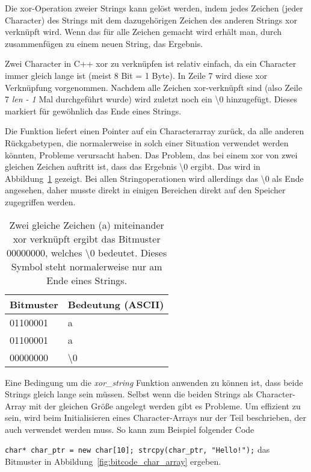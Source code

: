 \documentclass[]{article}
\begin{document}
Die xor-Operation zweier Strings kann gelöst werden, indem jedes Zeichen (jeder Character) des Strings mit dem dazugehörigen Zeichen des anderen Strings xor verknüpft wird. Wenn das für alle Zeichen gemacht wird erhält man, durch zusammenfügen zu einem neuen String, das Ergebnis.

Zwei Character in C++ xor zu verknüpfen ist relativ einfach, da ein Character immer gleich lange ist (meist 8 Bit = 1 Byte). In Zeile 7 wird diese xor Verknüpfung vorgenommen. Nachdem alle Zeichen xor-verknüpft sind (also Zeile 7 \textit{len - 1} Mal durchgeführt wurde) wird zuletzt noch ein \textbackslash 0 hinzugefügt. Dieses markiert für gewöhnlich das Ende eines Strings.

Die Funktion liefert einen Pointer auf ein Characterarray zurück, da alle anderen Rückgabetypen, die normalerweise in solch einer Situation verwendet werden könnten, Probleme verursacht haben. Das Problem, das bei einem xor von zwei gleichen Zeichen auftritt ist, dass das Ergebnis \textbackslash 0 ergibt. Das wird in Abbildung~\ref{fig:xor_gleiches_zeichen} gezeigt. Bei allen Stringoperationen wird allerdings das \textbackslash 0 als Ende angesehen, daher musste direkt in einigen Bereichen direkt auf den Speicher zugegriffen werden.

\begin{table}[]
	\centering
	\begin{tabular}{l|l}
		Bitmuster  & Bedeutung (ASCII)\\ \hline
		01100001   & a                \\
		01100001   & a                \\ \hline
		00000000   & \textbackslash 0 \\
	\end{tabular}
	\caption{Zwei gleiche Zeichen (a) miteinander xor verknüpft ergibt das Bitmuster 00000000, welches \textbackslash 0 bedeutet. Dieses Symbol steht normalerweise nur am Ende eines Strings.}
	\label{fig:xor_gleiches_zeichen}
\end{table}

Eine Bedingung um die \textit{xor\_string} Funktion anwenden zu können ist, dass beide Strings gleich lange sein müssen. Selbst wenn die beiden Strings als Character-Array mit der gleichen Größe angelegt werden gibt es Probleme. Um effizient zu sein, wird beim Initialisieren eines Character-Arrays nur der Teil beschrieben, der auch verwendet werden muss. So kann zum Beispiel folgender Code

\noindent
\lstinline|char* char_ptr = new char[10]; strcpy(char_ptr, "Hello!");| das Bitmuster in Abbildung~\ref{fig:bitcode_char_array} ergeben.
\end{document}
